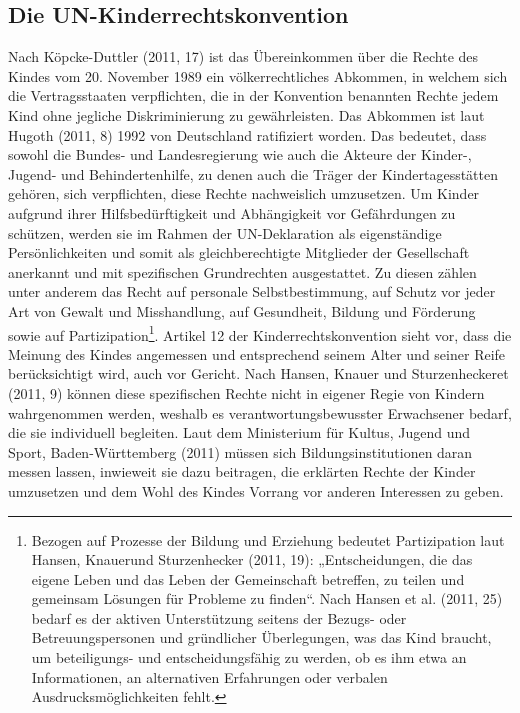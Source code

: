 \subsection{Die UN-Kinderrechtskonvention}

Nach Köpcke-Duttler (2011, 17) ist das Übereinkommen über die Rechte des Kindes vom 20. November 1989 ein völkerrechtliches Abkommen, in welchem sich die Vertragsstaaten verpflichten, die in der Konvention benannten Rechte jedem Kind ohne jegliche Diskriminierung zu gewährleisten. Das Abkommen ist laut Hugoth (2011, 8) 1992 von Deutschland ratifiziert worden. Das bedeutet, dass sowohl die Bundes- und Landesregierung wie auch die Akteure der Kinder-, Jugend- und Behindertenhilfe, zu denen auch die Träger der Kindertagesstätten gehören, sich verpflichten, diese Rechte nachweislich umzusetzen. Um Kinder aufgrund ihrer Hilfsbedürftigkeit und Abhängigkeit vor Gefährdungen zu schützen, werden sie im Rahmen der UN-Deklaration als eigenständige Persönlichkeiten und somit als gleichberechtigte Mitglieder der Gesellschaft anerkannt und mit spezifischen Grundrechten ausgestattet. Zu diesen zählen unter anderem das Recht auf personale Selbstbestimmung, auf Schutz vor jeder Art von Gewalt und Miss\-handlung, auf Gesundheit, Bildung und Förderung sowie auf Partizipation\footnote{Bezogen auf Prozesse der Bildung und Erziehung bedeutet Partizipation laut Hansen, Knauerund Sturzenhecker (2011, 19): „Entscheidungen, die das eigene Leben und das Leben der Gemeinschaft betreffen, zu teilen und gemeinsam Lösungen für Probleme zu finden“. Nach Hansen et al. (2011, 25) bedarf es der aktiven Unterstützung seitens der Bezugs- oder Betreuungspersonen und gründlicher  Überlegungen, was das Kind braucht, um beteiligungs- und entscheidungsfähig zu werden, ob es ihm etwa an Informationen, an alternativen Erfahrungen oder verbalen Ausdrucksmöglichkeiten fehlt.}. 
Artikel 12 der Kinderrechtskonvention sieht vor, dass die Meinung des Kindes angemessen und entsprechend seinem Alter und seiner Reife berücksichtigt wird, auch vor Gericht. Nach Hansen, Knauer und Sturzenheckeret (2011, 9) können diese spezifischen Rechte nicht in eigener Regie von Kindern wahrgenommen werden, weshalb es verantwortungsbewusster Erwachsener bedarf, die sie individuell begleiten. Laut dem Ministerium für Kultus, Jugend und Sport, Baden-Württemberg (2011) müssen sich Bildungsinstitutionen daran messen lassen, inwieweit sie dazu beitragen, die erklärten Rechte der Kinder umzusetzen und dem Wohl des Kindes Vorrang vor anderen Interessen zu geben.

